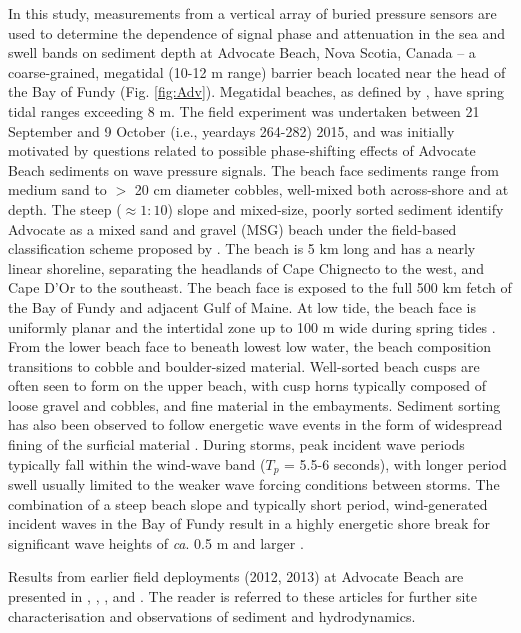 In this study, measurements from a vertical array of buried pressure sensors are used to determine the dependence of signal phase and attenuation in the sea and swell bands on sediment depth at Advocate Beach, Nova Scotia, Canada -- a coarse-grained, megatidal (10-12 m range) barrier beach located near the head of the Bay of Fundy (Fig. \ref{fig:Adv}). Megatidal beaches, as defined by \citet{Levoy_etal2000}, have spring tidal ranges exceeding 8 m. The field experiment was undertaken between 21 September and 9 October (i.e., yeardays 264-282) 2015, and was initially motivated by questions related to possible phase-shifting effects of Advocate Beach sediments on wave pressure signals. The beach face sediments range from medium sand to $>$ 20 cm diameter cobbles, well-mixed both across-shore and at depth. The steep ($\approx 1:10$) slope and mixed-size, poorly sorted sediment identify Advocate as a mixed sand and gravel (MSG) beach under the field-based classification scheme proposed by \citet{Jennings_Shulmeister2002}. The beach is 5 km long and has a nearly linear shoreline, separating the headlands of Cape Chignecto to the west, and Cape D'Or to the southeast. The beach face is exposed to the full 500 km fetch of the Bay of Fundy and adjacent Gulf of Maine. At low tide, the beach face is uniformly planar and the intertidal zone up to 100 m wide during spring tides \citep[see][]{Taylor_etal1985, Hay_etal2014}. From the lower beach face to beneath lowest low water, the beach composition transitions to cobble and boulder-sized material. Well-sorted beach cusps are often seen to form on the upper beach, with cusp horns typically composed of loose gravel and cobbles, and fine material in the embayments. Sediment sorting has also been observed to follow energetic wave events in the form of widespread fining of the surficial material \citep{Hay_etal2014}. During storms, peak incident wave periods typically fall within the wind-wave band ($T_p$ = 5.5-6 seconds), with longer period swell usually limited to the weaker wave forcing conditions between storms. The combination of a steep beach slope and typically short period, wind-generated incident waves in the Bay of Fundy result in a highly energetic shore break for significant wave heights of \textit{ca}. 0.5 m and larger \citep{Hay_etal2014}.

Results from earlier field deployments (2012, 2013) at Advocate Beach are presented in \citet{Hay_etal2014}, \citet{Stark_Hay2014}, \citet{Stark_etal2014}, and \citet{Wilson_etal2014}. The reader is referred to these articles for further site characterisation and observations of sediment and hydrodynamics.


